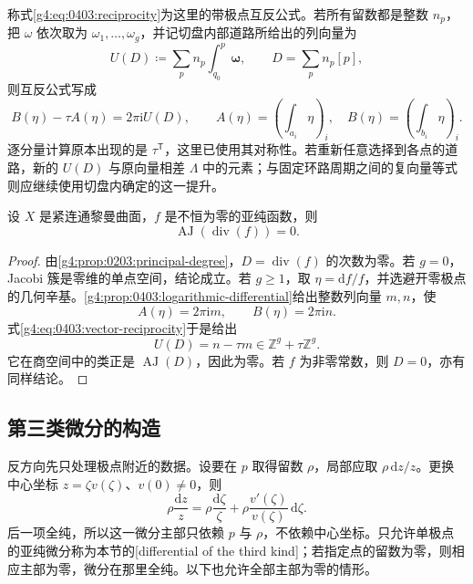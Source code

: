 称式\eqref{g4:eq:0403:reciprocity}为这里的带极点互反公式。若所有留数都是整数 \(n_p\)，把 \(\omega\) 依次取为 \(\omega_1,\ldots,\omega_g\)，并记切盘内部道路所给出的列向量为
\[
	U(D)\coloneqq\sum_p n_p\int_{q_0}^{p}\boldsymbol\omega,
	\qquad D=\sum_p n_p[p],
\]
则互反公式写成
\begin{equation}
	\label{g4:eq:0403:vector-reciprocity}
	B(\eta)-\tau A(\eta)=2\pi\mathrm{i}U(D),
	\qquad
	A(\eta)=\left(\int_{a_i}\eta\right)_i,\quad
	B(\eta)=\left(\int_{b_i}\eta\right)_i.
\end{equation}
逐分量计算原本出现的是 \(\tau^{\mathsf T}\)，这里已使用其对称性。若重新任意选择到各点的道路，新的 \(U(D)\) 与原向量相差 \(\Lambda\) 中的元素；与固定环路周期之间的复向量等式则应继续使用切盘内确定的这一提升。

\begin{proposition}
	\label{g4:prop:0403:principal-periods}
	设 \(X\) 是紧连通黎曼曲面，\(f\) 是不恒为零的亚纯函数，则
	\[
		\operatorname{AJ}(\operatorname{div}(f))=0.
	\]
\end{proposition}
\begin{proof}
	由\cref{g4:prop:0203:principal-degree}，\(D=\operatorname{div}(f)\) 的次数为零。若 \(g=0\)，Jacobi 簇是零维的单点空间，结论成立。若 \(g\ge1\)，取 \(\eta=\mathrm{d}f/f\)，并选避开零极点的几何辛基。\cref{g4:prop:0403:logarithmic-differential}给出整数列向量 \(m,n\)，使
	\[
		A(\eta)=2\pi\mathrm{i}m,\qquad
		B(\eta)=2\pi\mathrm{i}n.
	\]
	式\eqref{g4:eq:0403:vector-reciprocity}于是给出
	\[
		U(D)=n-\tau m\in\mathbb Z^g+\tau\mathbb Z^g.
	\]
	它在商空间中的类正是 \(\operatorname{AJ}(D)\)，因此为零。若 \(f\) 为非零常数，则 \(D=0\)，亦有同样结论。
\end{proof}

\subsection{第三类微分的构造}
\label{g4:subsec:0403:02}
反方向先只处理极点附近的数据。设要在 \(p\) 取得留数 \(\rho\)，局部应取 \(\rho\,\mathrm{d}z/z\)。更换中心坐标 \(z=\zeta v(\zeta)\)、\(v(0)\ne0\)，则
\[
	\rho\frac{\mathrm{d}z}{z}
	=\rho\frac{\mathrm{d}\zeta}{\zeta}
	+\rho\frac{v'(\zeta)}{v(\zeta)}\,\mathrm{d}\zeta.
\]
后一项全纯，所以这一微分主部只依赖 \(p\) 与 \(\rho\)，不依赖中心坐标。只允许单极点的亚纯微分称为本节的[differential of the third kind]；若指定点的留数为零，则相应主部为零，微分在那里全纯。以下也允许全部主部为零的情形。

